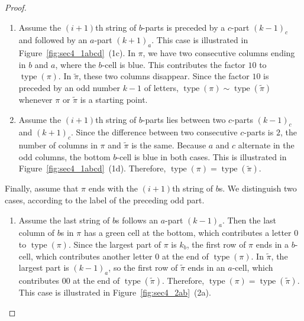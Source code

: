 \documentclass[11pt]{article}
\theoremstyle{definition}
\theoremstyle{remark}
\theoremstyle{definition}
\numberwithin{equation}{section}
\newcommand{\type}{\operatorname{type}}
\begin{document}
\begin{proof}
\begin{enumerate}[label=(1\alph*)]
In $\pi$, the column of $b$s has a green cell at the bottom and the next column has a $c$-cell at the bottom, which contributes the factor $01$ to $\type(\pi)$. In $\tilde{\pi}$, these two columns disappear and all other column endings are unchanged. Therefore, \(\type(\pi)\sim\type(\tilde{\pi})\).

\item Assume the $(i+1)$th string of \( b \)-parts is preceded by a \( c \)-part $(k-1)_c$ and followed by an \( a \)-part $(k+1)_a$. This case is illustrated in Figure~\ref{fig:sec4_1abcd}~(1c). In $\pi$, we have two consecutive columns ending in $b$ and $a$, where the $b$-cell is blue. This contributes the factor $10$ to $\type(\pi)$. In $\tilde{\pi}$, these two columns disappear. Since the factor $10$ is preceded by an odd number $k-1$ of letters, \(\type(\pi)\sim\type(\tilde{\pi})\) whenever $\pi$ or $\tilde{\pi}$ is a starting point.

\item Assume the $(i+1)$th string of \( b \)-parts lies between two \( c \)-parts $(k-1)_c$ and $(k+1)_c$. Since the difference between two consecutive \(c\)-parts is \(2\), the number of columns in \(\pi\) and \(\tilde{\pi}\) is the same. Because \(a\) and \(c\) alternate in the odd columns, the bottom \(b\)-cell is blue in both cases. This is illustrated in Figure~\ref{fig:sec4_1abcd}~(1d). Therefore, \(\type(\pi) = \type(\tilde{\pi})\).

\end{enumerate}
Finally, assume that $\pi$ ends with the $(i+1)$th string of $b$s. We distinguish two cases, according to the label of the preceding odd part.
\begin{enumerate}[label=(2\alph*)]
\item Assume the last string of $b$s follows an $a$-part $(k-1)_a$. Then the last column of $b$s in $\pi$ has a green cell at the bottom, which contributes a letter $0$ to $\type(\pi)$. Since the largest part of $\pi$ is $k_b$, the first row of $\pi$ ends in a $b$-cell, which contributes another letter $0$ at the end of $\type(\pi)$. In $\tilde{\pi}$, the largest part is $(k-1)_a$, so the first row of $\tilde{\pi}$ ends in an $a$-cell, which contributes $00$ at the end of $\type(\tilde{\pi})$. Therefore, \(\type(\pi) = \type(\tilde{\pi})\). This case is illustrated in Figure~\ref{fig:sec4_2ab}~(2a).

\begin{figure}[h]
    \centering


\end{figure}
\end{enumerate}
\end{proof}
\end{document}

